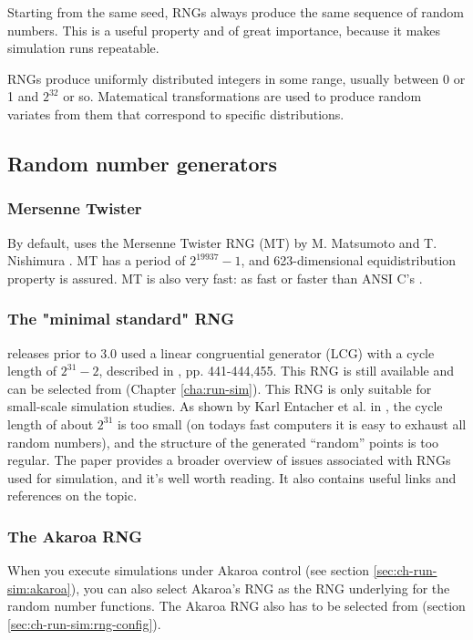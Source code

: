 Starting from the same seed, RNGs always produce the same sequence
of random numbers. This is a useful property and of great importance,
because it makes simulation runs repeatable.

RNGs produce uniformly distributed integers in some range,
usually between 0 or 1 and $2^{32}$ or so. Matematical transformations
are used to produce random variates from them that correspond to
specific distributions.

\subsection{Random number generators}

\subsubsection{Mersenne Twister}

By default, {\opp} uses the Mersenne Twister RNG (MT) by M. Matsumoto and
T. Nishimura \cite{Matsumoto98}. MT has a period of $2^19937-1$,
and 623-dimensional equidistribution property is assured. MT is
also very fast: as fast or faster than ANSI C's .

\subsubsection{The "minimal standard" RNG}

{\opp} releases prior to 3.0 used a linear congruential generator
(LCG) with a cycle length of $2^{31}-2$, described in
\cite{Jain91}, pp. 441-444,455. This RNG is still available
and can be selected from  (Chapter \ref{cha:run-sim}).
This RNG is only suitable for small-scale simulation studies.
As shown by Karl Entacher et al. in \cite{Entacher02},
the cycle length of about $2^{31}$ is too small (on todays
fast computers it is easy to exhaust all random numbers), and
the structure of the generated ``random'' points is too regular.
The \cite{Hellekalek98} paper provides a broader overview of issues
associated with RNGs used for simulation, and it's well worth reading.
It also contains useful links and references on the topic.

\subsubsection{The Akaroa RNG}

When you execute simulations under Akaroa control (see section
\ref{sec:ch-run-sim:akaroa}), you can also select Akaroa's
RNG as the RNG underlying for the {\opp} random number functions.
The Akaroa RNG also has to be selected from 
(section \ref{sec:ch-run-sim:rng-config}).

